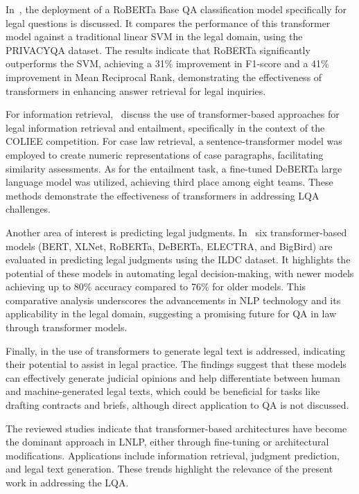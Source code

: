 \documentclass[runningheads]{llncs}
\begin{document}
In~\cite{Vold_Conrad_2021}, the deployment of a RoBERTa Base \ac{QA}
classification model specifically for legal questions is discussed.
It compares the performance of this transformer model against a
traditional linear \ac{SVM} in the legal domain, using the PRIVACYQA
dataset. The results indicate that RoBERTa significantly outperforms
the \ac{SVM}, achieving a 31\% improvement in F1-score and a 41\%
improvement in Mean Reciprocal Rank, demonstrating the effectiveness
of transformers in enhancing answer retrieval for legal inquiries.

For information retrieval,~\cite{Kim_Rabelo_Babiker_Rahman_Goebel_2024} discuss the use of
transformer-based approaches for legal information retrieval and
entailment, specifically in the context of the COLIEE competition. For
case law retrieval, a sentence-transformer model was employed
to create numeric representations of case paragraphs, facilitating
similarity assessments. As for the  entailment task, a fine-tuned DeBERTa
large language model was utilized, achieving third place among eight
teams. These methods demonstrate the effectiveness of transformers in
addressing \ac{LQA} challenges.

Another area of interest is predicting legal
judgments. In~\cite{Ghosh_Kumar_2024} six transformer-based models
(BERT, XLNet, RoBERTa, DeBERTa, ELECTRA, and BigBird) are evaluated in
predicting legal judgments using the ILDC dataset. It highlights the
potential of these models in automating legal decision-making, with
newer models achieving up to 80\% accuracy compared to 76\% for older
models. This comparative analysis underscores the advancements in
\ac{NLP} technology and its applicability in the legal domain,
suggesting a promising future for \ac{QA} in law through transformer
models.

Finally, in \cite{Peric_Mijic_Stammbach_Ash_2020} the use of
transformers to generate legal text is addressed, indicating their
potential to assist in legal practice. The findings suggest that these
models can effectively generate judicial opinions and help
differentiate between human and machine-generated legal texts, which
could be beneficial for tasks like drafting contracts and briefs,
although direct application to \ac{QA} is not discussed.

The reviewed studies indicate that transformer-based architectures
have become the dominant approach in \ac{LNLP}, either through
fine-tuning or architectural modifications. Applications include
information retrieval, judgment prediction, and legal text
generation. These trends highlight the relevance of the present work
in addressing the \ac{LQA}.
\newpage
\end{document}
